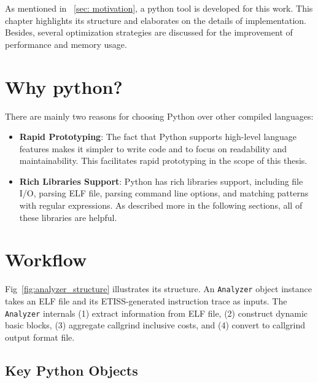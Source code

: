As mentioned in ~\ref{sec: motivation}, a python tool is developed for this work. This chapter highlights its structure and elaborates on the details of implementation. Besides, several optimization strategies are discussed for the improvement of performance and memory usage.

\section{Why python?}

There are mainly two reasons for choosing Python over other compiled languages:

\begin{itemize}
    \item \textbf{Rapid Prototyping}: The fact that Python supports high-level language features makes it simpler to write code and to focus on readability and maintainability. This facilitates rapid prototyping in the scope of this thesis.
    \item \textbf{Rich Libraries Support}: Python has rich libraries support, including file I/O, parsing ELF file, parsing command line options, and matching patterns with regular expressions. As described more in the following sections, all of these libraries are helpful.
\end{itemize}

\section{Workflow}

Fig~\ref{fig:analyzer_structure} illustrates its structure. An \texttt{Analyzer} object instance takes an ELF file and its ETISS-generated instruction trace as inputs. The \texttt{Analyzer} internals (1) extract information from ELF file, (2) construct dynamic basic blocks, (3) aggregate callgrind inclusive costs, and (4) convert to callgrind output format file. 

\medskip
{}
\medskip

\subsection{Key Python Objects}


